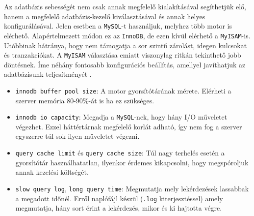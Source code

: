 Az adatbázis sebességét nem csak annak megfelelő kialakításával segíthetjük elő, hanem a megfelelő adatbázis-kezelő kiválasztásával és annak helyes konfigurálásával.
Jelen esetben a \texttt{MySQL}-t használjuk, melyhez több motor is elérhető. Alapértelmezett módon ez az \texttt{InnoDB}, de ezen kívül elérhető a \texttt{MyISAM}-is. Utóbbinak hátránya, hogy nem támogatja a sor szintű zárolást, idegen kulcsokat és tranzakciókat. A \texttt{MyISAM} választása emiatt viszonylag ritkán tekinthető jobb döntésnek. Íme néhány fontosabb konfigurációs beállítás, amellyel javíthatjuk az adatbázisunk teljesítményét \cite{other_optimization}.
\begin{itemize}
\item \texttt{innodb buffer pool size}: A motor gyorsítótárának mérete. Elérheti a szerver memória 80-90\%-át is ha ez szükséges.
\item \texttt{innodb io capacity}: Megadja a \texttt{MySQL}-nek, hogy hány I/O műveletet végezhet. Ezzel háttértárnak megfelelő korlát adható, így nem fog a szerver  egyszerre túl sok ilyen műveletet végezni.
\item \texttt{query cache limit} és \texttt{query cache size}: Túl nagy terhelés esetén a gyorsítótár használhatatlan, ilyenkor érdemes kikapcsolni, hogy megspóroljuk annak kezelési költségét.
\item \texttt{slow query log}, \texttt{long query time}: Megmutatja mely lekérdezések lassabbak a megadott időnél. Erről naplófájl készül (\texttt{.log} kiterjesztéssel) amely megmutatja, hány sort érint a lekérdezés, mikor és ki hajtotta végre.
\end{itemize}

